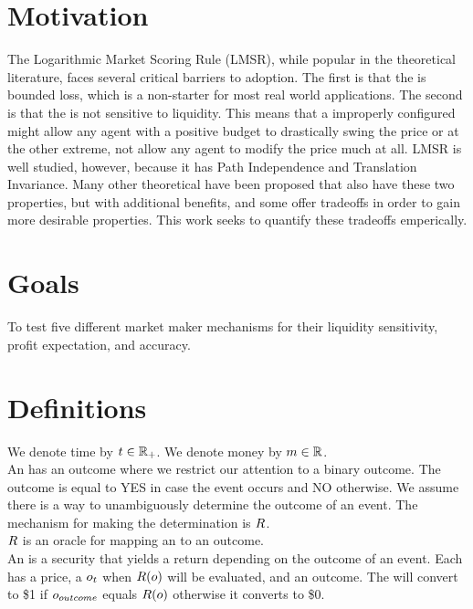 \section{Motivation}
The Logarithmic Market Scoring Rule (LMSR), while popular in the theoretical
literature, faces several critical barriers to adoption. The first is that
the  is bounded loss, which is a non-starter for most
real world applications. The second is that the  is not
sensitive to liquidity. This means that a improperly configured 
might allow any agent with a positive budget to drastically swing the price or at
the other extreme, not allow any agent to modify the price much at all. LMSR is
well studied, however, because it has Path Independence and Translation Invariance.
Many other theoretical  have been proposed that also have
these two properties, but with additional benefits, and some offer tradeoffs in
order to gain more desirable properties. This work seeks to quantify these
tradeoffs emperically.

\section{Goals}
To test five different market maker mechanisms for their liquidity sensitivity,
profit expectation, and accuracy.  


\section{Definitions}

We denote time by $t\in\mathbb{R}_+$. We denote money by $m\in\mathbb{R}$.\\

An  has an outcome where we restrict our attention to a binary outcome. 
The outcome is equal to YES in case the event occurs and NO otherwise. We assume there 
is a way to unambiguously determine the outcome of an event. The mechanism for making
the determination is $R$.\\

$R$ is an oracle for mapping an  to an outcome.\\

An  is a security that yields a return depending on the outcome of an 
event. Each  has a price, a $o_{t}$ when $R(o)$ will be
evaluated, and an outcome. The  will convert to \$1 if $o_{outcome}$
equals $R(o)$ otherwise it converts to \$0.\\

